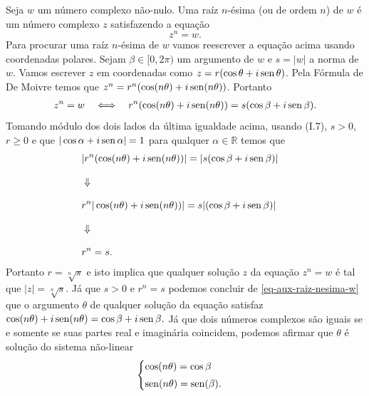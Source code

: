 Seja $w$ um número complexo não-nulo. Uma raíz $n$-ésima (ou de ordem $n$)
de $w$ é um número complexo $z$ satisfazendo a equação 
\[
z^n = w.
\]
Para procurar uma raíz $n$-ésima de $w$ vamos reescrever a equação acima 
usando coordenadas polares. Sejam $\beta\in [0,2\pi)$ um argumento de $w$ e $s=|w|$ 
a norma de $w$. Vamos escrever $z$ em coordenadas como $z=r(\cos\theta+i\operatorname{sen}\theta)$.
Pela Fórmula de De Moivre temos que $z^n=r^n(\cos(n\theta)+i\operatorname{sen}(n\theta))$.
Portanto 
\begin{align}\label{eq-aux-raiz-nesima-w}
z^n=w \quad \Longleftrightarrow \quad r^n(\cos(n\theta)+i\operatorname{sen}(n\theta)) = s(\cos\beta+i\operatorname{sen}\beta).
\end{align}
Tomando módulo dos dois lados da última igualdade acima, usando (I.7), $s>0$, $r\geqslant 0$ 
e que $|\cos\alpha+i\operatorname{sen}\alpha|=1$ para qualquer $\alpha\in\mathbb{R}$ temos que 
\begin{eqnarray*}
&|r^n(\cos(n\theta)+i\operatorname{sen}(n\theta))| = |s(\cos\beta+i\operatorname{sen}\beta)|&
\\[0.3cm]
&\Downarrow&
\\[0.3cm]
&r^n|\cos(n\theta)+i\operatorname{sen}(n\theta))| = s|(\cos\beta+i\operatorname{sen}\beta)|&
\\[0.3cm]
&\Downarrow&
\\[0.3cm]
&r^n=s.&
\end{eqnarray*}
Portanto $r = \sqrt[n]{s}$ e isto implica que qualquer solução $z$ da 
equação $z^n=w$ é tal que $|z|=  \sqrt[n]{s}$. Já que $s>0$ e $r^n=s$ podemos
concluir de \eqref{eq-aux-raiz-nesima-w} que o argumento $\theta$ de qualquer solução 
da equação satisfaz
$
\cos(n\theta)+i\operatorname{sen}(n\theta) = \cos\beta+i\operatorname{sen}\beta.
$
Já que dois números complexos são iguais se e somente se suas partes real e imaginária
coincidem, podemos afirmar que $\theta$ é solução do sistema não-linear
\[
\begin{cases}
\cos(n\theta)=\cos\beta
\\[0.1cm]
\operatorname{sen}(n\theta)=\operatorname{sen}(\beta).
\end{cases}
\]

